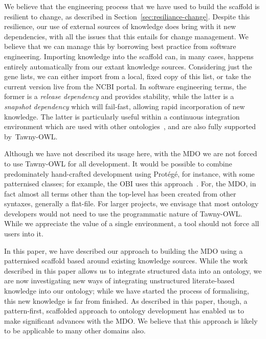 \documentclass{icbo}
\newcommand{\tawny}{Tawny-OWL\xspace}
\newcommand{\protege}{Prot\'eg\'e\xspace}
\begin{document}
We believe that the engineering process that we have used to build the
scaffold is resilient to change, as described in
Section~\ref{sec:resiliance-change}. Despite this resilience, our use
of external sources of knowledge does bring with it new dependencies,
with all the issues that this entails for change management. We
believe that we can manage this by borrowing best practice from
software engineering. Importing knowledge into the scaffold can, in
many cases, happens entirely automatically from our extant knowledge
sources. Considering just the gene lists, we can either import from a
local, fixed copy of this list, or take the current version live from
the NCBI portal. In software engineering terms, the former is a
\textit{release dependency} and provides stability, while the latter
is a \textit{snapshot dependency} which will fail-fast, allowing rapid
incorporation of new knowledge. The latter is particularly useful
within a continuous integration environment which are used with other
ontologies~\citep{greycite2899}, and are also fully supported
by~\tawny\citep{tawny}.

Although we have not described its usage here, with the MDO we are not
forced to use \tawny for all development. It would be possible to
combine predominately hand-crafted development using \protege, for
instance, with some patternised classes; for example, the OBI uses
this approach~\citep{2041-1480-1-s1-s7}. For, the MDO, in fact almost
all terms other than the top-level has been created from other
syntaxes, generally a flat-file. For larger projects, we envisage that
most ontology developers would not need to use the programmatic nature
of \tawny. While we appreciate the value of a single environment, a
tool should not force all users into it.

In this paper, we have described our approach to building the MDO
using a patternised scaffold based around existing knowledge
sources. While the work described in this paper allows us to integrate
structured data into an ontology, we are now investigating new ways of
integrating unstructured literate-based knowledge into our ontology;
while we have started the process of formalising, this new knowledge
is far from finished. As described in this paper, though, a
pattern-first, scaffolded approach to ontology development has enabled
us to make significant advances with the MDO. We believe that this
approach is likely to be applicable to many other domains also.




\end{document}

